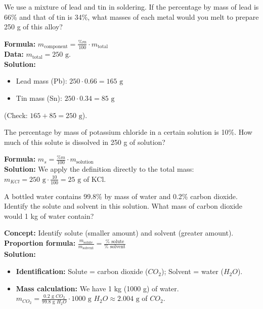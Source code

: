 \begin{exercise}
    We use a mixture of lead and tin in soldering. If the percentage by mass of lead is 66\% and that of tin is 34\%, what masses of each metal would you melt to prepare 250 g of this alloy?
    \begin{solu}
        \textbf{Formula:} $m_{\text{component}} = \frac{\%m}{100} \cdot m_{\text{total}}$ \\

        \textbf{Data:} $m_{\text{total}} = 250 \text{ g}$. \\

        \textbf{Solution:}
        \begin{itemize}
            \item Lead mass (Pb): $250 \cdot 0.66 = 165 \text{ g}$
            \item Tin mass (Sn): $250 \cdot 0.34 = 85 \text{ g}$
        \end{itemize}
        (Check: $165 + 85 = 250 \text{ g}$).
    \end{solu}
\end{exercise}


\begin{exercise}
    The percentage by mass of potassium chloride in a certain solution is 10\%. How much of this solute is dissolved in 250 g of solution?
    \begin{solu}
        \textbf{Formula:} $m_s = \frac{\%m}{100} \cdot m_{\text{solution}}$ \\
        \textbf{Solution:} We apply the definition directly to the total mass: \\
        $m_{KCl} = 250 \text{ g} \cdot \frac{10}{100} = 25 \text{ g}$ of KCl.
    \end{solu}
\end{exercise}

\begin{exercise}
    A bottled water contains 99.8\% by mass of water and 0.2\% carbon dioxide. Identify the solute and solvent in this solution. What mass of carbon dioxide would 1 kg of water contain?
    \begin{solu}
        \textbf{Concept:} Identify solute (smaller amount) and solvent (greater amount). \\
        \textbf{Proportion formula:} $\frac{m_{\text{solute}}}{m_{\text{solvent}}} = \frac{\% \text{ solute}}{\% \text{ solvent}}$ \\
        \textbf{Solution:}
        \begin{itemize}
            \item \textbf{Identification:} Solute = carbon dioxide ($CO_2$); Solvent = water ($H_2O$).
            \item \textbf{Mass calculation:} We have 1 kg (1000 g) of water. \\
            $m_{CO_2} = \frac{0.2 \text{ g } CO_2}{99.8 \text{ g } H_2O} \cdot 1000 \text{ g } H_2O \approx 2.004 \text{ g}$ of $CO_2$.
        \end{itemize}
    \end{solu}
\end{exercise}

